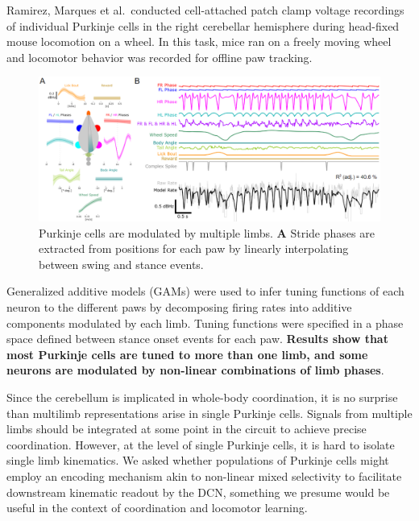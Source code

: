 Ramirez, Marques et al.~conducted cell-attached patch clamp voltage recordings of individual Purkinje cells in the right cerebellar hemisphere during head-fixed mouse locomotion on a wheel. In this task, mice ran on a freely moving wheel and locomotor behavior was recorded for offline paw tracking.

\begin{figure}[h]
    \centering
    \includegraphics[width=0.99\linewidth]{Chapters/Figures/chapter3/gam-methods.png}
    \caption{Purkinje cells are modulated by multiple limbs. \textbf{A} Stride phases are extracted from positions for each paw by linearly interpolating between swing and stance events.}
    \label{fig:gam-methods}
\end{figure}

Generalized additive models (GAMs) were used to infer tuning functions of each neuron to the different paws by decomposing firing rates into additive components modulated by each limb. Tuning functions were specified in a phase space defined between stance onset events for each paw. \textbf{Results show that most Purkinje cells are tuned to more than one limb, and some neurons are modulated by non-linear combinations of limb phases}\cite{ramirezburitica2024nonlinear}.

Since the cerebellum is implicated in whole-body coordination, it is no surprise than multilimb representations arise in single Purkinje cells. Signals from multiple limbs should be integrated at some point in the circuit to achieve precise coordination. However, at the level of single Purkinje cells, it is hard to isolate single limb kinematics. We asked whether populations of Purkinje cells might employ an encoding mechanism akin to non-linear mixed selectivity to facilitate downstream kinematic readout by the DCN, something we presume would be useful in the context of coordination and locomotor learning.

